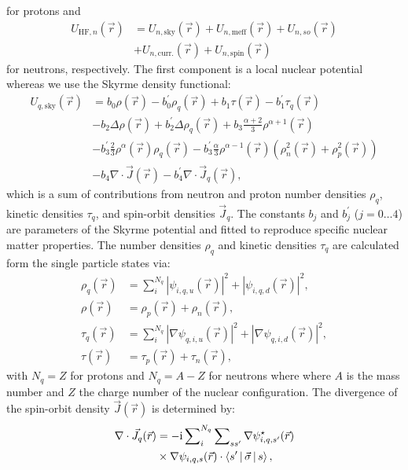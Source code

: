 \documentclass[3p]{elsarticle}
\begin{document}
for protons and
\begin{align}
U_{\mathrm{HF}, n} (\vec{r}) &= U_{n,\mathrm{sky}} (\vec{r}) + U_{n, \mathrm{meff}}  (\vec{r}) + U_{n, so}  (\vec{r}) \nonumber\\
& + U_{n, \mathrm{curr.}}  (\vec{r}) + U_{n, \mathrm{spin}}  (\vec{r}) 
\label{Uneutrons}
\end{align}
for neutrons, respectively. The first component is a local nuclear potential whereas we use the Skyrme density functional:
\begin{align}
U_{q,\mathrm{sky}} (\vec{r}) &=  b_0 \rho (\vec{r}) - b^{\prime}_0 \rho_q (\vec{r}) + b_1 \tau (\vec{r}) - b^{\prime}_1 \tau_q (\vec{r}) \nonumber\\
&- b_2 \Delta \rho (\vec{r}) + b^{\prime}_2 \Delta \rho_q (\vec{r}) + b_3 \frac{\alpha+2}{3} \rho^{\alpha + 1}  (\vec{r}) \nonumber\\
&- b^{\prime}_3 \frac{2}{3} \rho^\alpha  (\vec{r}) \rho_q  (\vec{r}) - b^{\prime}_3 \frac{\alpha}{3} \rho^{\alpha - 1}  (\vec{r}) \left( \rho^2_n (\vec{r}) + \rho^2_p  (\vec{r}) \right) \nonumber\\
&- b_4 \nabla \cdot \vec{J}  (\vec{r}) - b_4^\prime \nabla \cdot \vec{J} _q   (\vec{r}),            
\label{Uskyrme}       
\end{align}
which is a sum of contributions from neutron and proton number densities $\rho_q$, kinetic densities $\tau_q$, and spin-orbit densities $\vec{J}_q$. The constants $b_j$ and $b^{\prime}_j$ ($j=0 \dots 4$) are parameters of the Skyrme potential and fitted to reproduce specific nuclear matter properties. The number densities $\rho_q$ and kinetic densities $\tau_q$ are calculated form the single particle states via: 
\begin{align}
\rho_q (\vec{r}) &= \sum\nolimits_{i}^{N_q} \left| \psi_{i,q,u} (\vec{r}) \right|^2 +  \left| \psi_{i,q,d} (\vec{r}) \right|^2 ,\\ 
\rho (\vec{r}) &= \rho_p (\vec{r})+ \rho_n (\vec{r}), \\
\tau_q (\vec{r}) &= \sum\nolimits_{i}^{N_q} \left| \nabla \psi_{q,i,u} (\vec{r}) \right|^2 +  \left| \nabla \psi_{q,i,d} (\vec{r}) \right|^2, \\ 
\tau(\vec{r}) &= \tau_p (\vec{r})+ \tau_n (\vec{r}),
\end{align}
with $N_q = Z$ for protons and $N_q = A-Z$ for neutrons where where $A$ is the mass number and $Z$ the charge number of the nuclear configuration. The divergence of the spin-orbit density $\vec{J}(\vec{r})$ is determined by:
\begin{align}
\nabla \cdot \vec{J}_q (\vec{r}) & = -\mathrm{i} \sum\nolimits_i^{N_q} \sum\nolimits_{s s^\prime} \nabla \psi_{i, q, s^\prime}^\star (\vec{r}) \nonumber\\
& \times \nabla \psi_{i,q,s} (\vec{r})  \cdot  \Braket{ s^\prime  | \vec{\sigma} | s} , 
\label{divJ}
\end{align}
\end{document}
